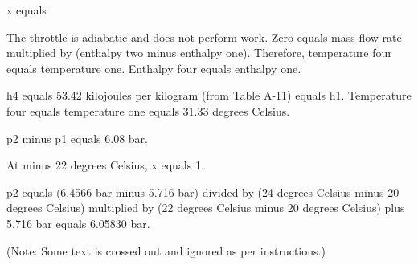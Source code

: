 x equals  

The throttle is adiabatic and does not perform work.  
Zero equals mass flow rate multiplied by (enthalpy two minus enthalpy one). Therefore, temperature four equals temperature one.  
Enthalpy four equals enthalpy one.  

h4 equals 53.42 kilojoules per kilogram (from Table A-11) equals h1.  
Temperature four equals temperature one equals 31.33 degrees Celsius.  

p2 minus p1 equals 6.08 bar.  

At minus 22 degrees Celsius, x equals 1.  

p2 equals (6.4566 bar minus 5.716 bar) divided by (24 degrees Celsius minus 20 degrees Celsius) multiplied by (22 degrees Celsius minus 20 degrees Celsius) plus 5.716 bar equals 6.05830 bar.  

(Note: Some text is crossed out and ignored as per instructions.)